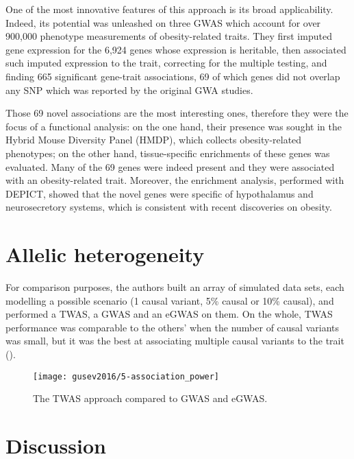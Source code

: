 \documentclass[../main.tex]{subfiles}
\begin{document}
One of the most innovative features of this approach is its broad 
applicability. Indeed, its potential was unleashed on three GWAS which 
account for over 900,000 phenotype measurements of obesity-related 
traits. They first 
imputed gene expression for the 6,924 genes whose expression is 
heritable, then associated such imputed expression to the trait, 
correcting for the multiple testing, and finding 665 significant 
gene-trait associations, 69 of which genes did not overlap any SNP which 
was reported by the original GWA studies.

Those 69 novel associations are the most interesting ones, therefore 
they were the focus of a functional analysis: on the one hand, their 
presence was sought in the Hybrid Mouse Diversity Panel (HMDP), which 
collects obesity-related phenotypes; on the other hand, tissue-specific 
enrichments of these genes was evaluated. Many of the 69 genes were 
indeed present and they were associated with an obesity-related trait. 
Moreover, the enrichment analysis, performed with DEPICT, showed that 
the novel genes were specific of hypothalamus and neurosecretory 
systems, which is consistent with recent discoveries on obesity.

\section{Allelic heterogeneity}

For comparison purposes, the authors built an array of simulated data 
sets, each modelling a possible scenario (1 causal variant, 5\% causal 
or 10\% causal), and performed a TWAS, a GWAS and an eGWAS on them. On 
the whole, TWAS performance was comparable to the others' when the 
number of causal variants was small, but it was the best at associating 
multiple causal variants to the trait ().


\begin{figure}
	\texttt{[image: gusev2016/5-association\_power]}
	\caption{The TWAS approach compared to GWAS and eGWAS.}
\end{figure}

\section{Discussion}
\end{document}
